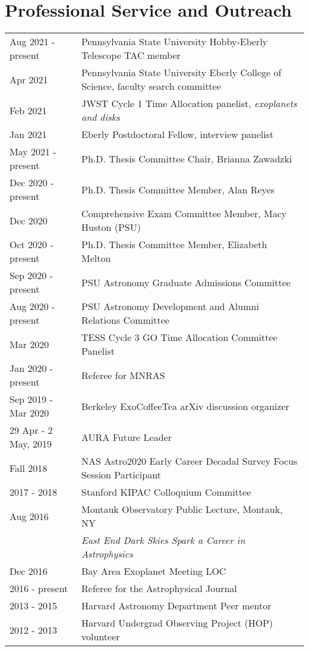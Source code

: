 \section*{Professional Service and Outreach}
\begin{tabular*}{\textwidth}{@{\hspace{10pt}}p{1.4in}l}
Aug 2021 - present & Pennsylvania State University Hobby-Eberly Telescope TAC member\\    
Apr 2021 & Pennsylvania State University Eberly College of Science, faculty search committee\\
Feb 2021 & JWST Cycle 1 Time Allocation panelist, \emph{exoplanets and disks}\\
Jan 2021 & Eberly Postdoctoral Fellow, interview panelist\\
May 2021 - present & Ph.D. Thesis Committee Chair, Brianna Zawadzki\\
Dec 2020 - present & Ph.D. Thesis Committee Member, Alan Reyes\\
Dec 2020 & Comprehensive Exam Committee Member, Macy Huston (PSU)\\
Oct 2020 - present & Ph.D. Thesis Committee Member, Elizabeth Melton\\
Sep 2020 - present & PSU Astronomy Graduate Admissions Committee \\ 
Aug 2020 - present & PSU Astronomy Development and Alumni Relations Committee \\
Mar 2020 & TESS Cycle 3 GO Time Allocation Committee Panelist \\
Jan 2020 - present & Referee for MNRAS \\ 
Sep 2019 - Mar 2020 & Berkeley ExoCoffeeTea arXiv discussion organizer \\ 
29 Apr - 2 May, 2019 & AURA Future Leader \\
Fall 2018 & NAS Astro2020 Early Career Decadal Survey Focus Session Participant \\
2017 - 2018 & Stanford KIPAC Colloquium Committee \\
Aug 2016 & Montauk Observatory Public Lecture, Montauk, NY \\
&  \emph{East End Dark Skies Spark a Career in Astrophysics}\\
Dec 2016 & Bay Area Exoplanet Meeting LOC \\
2016 - present & Referee for the Astrophysical Journal \\
2013 - 2015 & Harvard Astronomy Department Peer mentor\\
2012 - 2013 & Harvard Undergrad Observing Project (HOP) volunteer\\

\end{tabular*}
